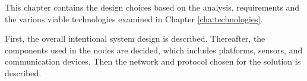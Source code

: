 \label{cha:designintro}

This chapter contains the design choices based on the analysis, requirements and the various viable technologies examined in Chapter \ref{cha:technologies}.

First, the overall intentional system design is described. Thereafter, the components used in the nodes are decided, which includes platforms, sensors, and communication devices.
Then the network and protocol chosen for the solution is described.






